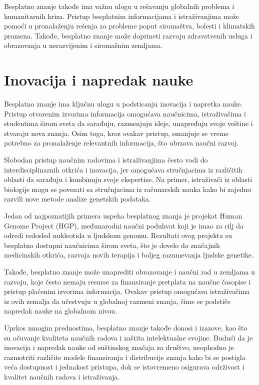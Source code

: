 \documentclass[a4paper]{article}
\begin{document}
{Besplatno znanje takođe ima važnu ulogu u rešavanju globalnih problema i humanitarnih kriza. Pristup besplatnim informacijama i istraživanjima može pomoći u pronalaženju rešenja za probleme poput siromaštva, bolesti i klimatskih promena.\cite{sesta} Takođe, besplatno znanje može doprineti razvoju zdravstvenih usluga i obrazovanja u nerazvijenim i siromašnim zemljama.




\setlength{\parskip}{1em}

\section{Inovacija i napredak nauke}
\label{sec:Inovacija i napredak nauke}


Besplatno znanje ima ključnu ulogu u podsticanju inovacija i napretka nauke. Pristup otvorenim izvorima informacija omogućava naučnicima, istraživačima i studentima širom sveta da sarađuju, razmenjuju ideje, unapređuju svoje veštine i stvaraju nova znanja. Osim toga, kroz ovakav pristup, smanjuje se vreme potrebno za pronalaženje relevantnih informacija, što ubrzava naučni razvoj.

Slobodan pristup naučnim radovima i istraživanjima često vodi do interdisciplinarnih otkrića i inovacija, jer omogućava stručnjacima iz različitih oblasti da sarađuju i kombinuju svoje ekspertize. Na primer, istraživači iz oblasti biologije mogu se povezati sa stručnjacima iz računarskih nauka kako bi zajedno razvili nove metode analize genetskih podataka.

Jedan od najpoznatijih primera uspeha besplatnog znanja je projekat Human Genome Project (HGP), međunarodni naučni poduhvat koji je imao za cilj da odredi redosled nukleotida u  ljudskom genomu. Rezultati ovog projekta su besplatno dostupni naučnicima širom sveta, što je dovelo do značajnih medicinskih otkrića, razvoja novih terapija i boljeg razumevanja ljudske genetike.

Takođe, besplatno znanje može unaprediti obrazovanje i naučni rad u zemljama u razvoju, koje često nemaju resurse za finansiranje pretplata na naučne časopise i pristup plaćenim izvorima informacija. Ovakav pristup omogućava istraživačima iz ovih zemalja da učestvuju u globalnoj razmeni znanja, čime se podstiče napredak nauke na globalnom nivou.

Uprkos mnogim prednostima, besplatno znanje takođe donosi i izazove, kao što su očuvanje kvaliteta naučnih radova i zaštita intelektualne svojine. Budući da je inovacija i napredak nauke od suštinskog značaja za društvo, neophodno je razmotriti različite modele finansiranja i distribucije znanja kako bi se postigla veća dostupnost i jednakost pristupa, dok se istovremeno osigurava održivost i kvalitet naučnih radova i istraživanja.


}
\end{document}
